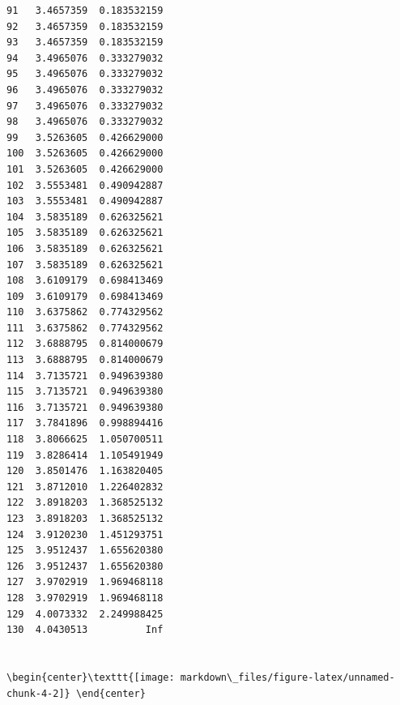 \documentclass[
]{article}
\begin{document}
\begin{verbatim}
91   3.4657359  0.183532159
92   3.4657359  0.183532159
93   3.4657359  0.183532159
94   3.4965076  0.333279032
95   3.4965076  0.333279032
96   3.4965076  0.333279032
97   3.4965076  0.333279032
98   3.4965076  0.333279032
99   3.5263605  0.426629000
100  3.5263605  0.426629000
101  3.5263605  0.426629000
102  3.5553481  0.490942887
103  3.5553481  0.490942887
104  3.5835189  0.626325621
105  3.5835189  0.626325621
106  3.5835189  0.626325621
107  3.5835189  0.626325621
108  3.6109179  0.698413469
109  3.6109179  0.698413469
110  3.6375862  0.774329562
111  3.6375862  0.774329562
112  3.6888795  0.814000679
113  3.6888795  0.814000679
114  3.7135721  0.949639380
115  3.7135721  0.949639380
116  3.7135721  0.949639380
117  3.7841896  0.998894416
118  3.8066625  1.050700511
119  3.8286414  1.105491949
120  3.8501476  1.163820405
121  3.8712010  1.226402832
122  3.8918203  1.368525132
123  3.8918203  1.368525132
124  3.9120230  1.451293751
125  3.9512437  1.655620380
126  3.9512437  1.655620380
127  3.9702919  1.969468118
128  3.9702919  1.969468118
129  4.0073332  2.249988425
130  4.0430513          Inf


\begin{center}\texttt{[image: markdown\_files/figure-latex/unnamed-chunk-4-2]} \end{center}


\end{verbatim}
\end{document}
